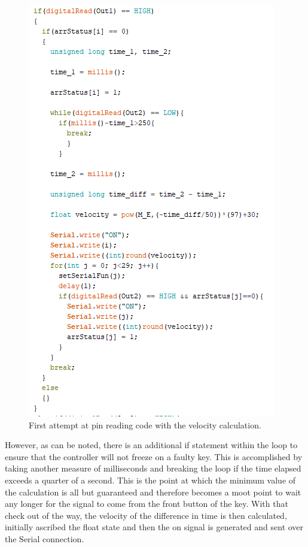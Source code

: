 \begin{figure}[h!]
  \centering
  \includegraphics{image/pinreadingvelocity.png}
  \caption{First attempt at pin reading code with the velocity calculation.}
\end{figure}

However, as can be noted, there is an additional if statement within the loop to ensure
that the controller will not freeze on a faulty key. This is accomplished by taking
another measure of milliseconds and breaking the loop if the time elapsed exceeds a
quarter of a second. This is the point at which the minimum value of the calculation is
all but guaranteed and therefore becomes a moot point to wait any longer for the signal to
come from the front button of the key. With that check out of the way, the velocity of the
difference in time is then calculated, initially ascribed the float state and then the on
signal is generated and sent over the Serial connection.

